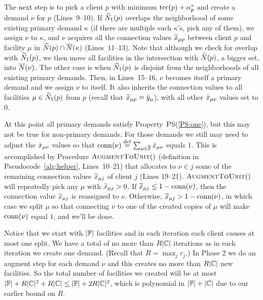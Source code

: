 \documentclass[11pt]{article}
\begin{document}


The next step is to pick a client $p$ with minimum
$\textrm{tcc}(p)+\alpha_p^\ast$ and create a demand $\nu$ for $p$
(Lines~9--10). If ${\widetilde N}_1(p)$ overlaps the neighborhood
of some existing primary demand $\kappa$ (if there are
multiple such $\kappa$'s, pick any of them), we assign $\nu$
to $\kappa$, and $\nu$ acquires all the connection values
${\widetilde x}_{\mu p}$ between client $p$ and facility $\mu$ in
${\widetilde N}(p)\cap {\overline{N}}(\kappa)$ (Lines~11--13). Note that
although we check for overlap with ${\widetilde N}_1(p)$, we then
move all facilities in the intersection with ${\widetilde N}(p)$,
a bigger set, into ${\overline{N}}(\nu)$.  The other case is when
${\widetilde N}_1(p)$ is disjoint from the neighborhoods of all
existing primary demands. Then, in Lines~15--16, $\nu$
becomes itself a primary demand and we assign $\nu$ to
itself. It also inherits the connection values to all
facilities $\mu\in{\widetilde N}_1(p)$ from $p$ (recall that
${\widetilde x}_{\mu p} = {\bar y}_{\mu}$), with all other
${\bar x}_{\mu\nu}$ values set to $0$.

At this point all primary demands satisfy
Property~PS(\ref{PS:one}), but this may not be true for
non-primary demands. For those demands we still may need to
adjust the ${\bar x}_{\mu\nu}$ values so that ${\textrm{conn}}(\nu)
\stackrel{\mathrm{def}}{=}
\sum_{\mu\in\overline{\mathbb{F}}}{\bar x}_{\mu \nu}$ equals $1$. This
is accomplished by Procedure ${\textsc{AugmentToUnit}}()$ (definition
in Pseudocode~\ref{alg:helper}, Lines~10--21) that allocates
to $\nu\in j$ some of the remaining connection values
${\widetilde x}_{\mu j}$ of client $j$ (Lines 19--21).
${\textsc{AugmentToUnit}}()$ will repeatedly pick any $\mu$ with
${\widetilde x}_{\mu j} >0$.  If ${\widetilde x}_{\mu j} \leq
1-{\textrm{conn}}(\nu)$, then the connection value ${\widetilde x}_{\mu
  j}$ is reassigned to $\nu$. Otherwise, ${\widetilde x}_{\mu j} >
1-{\textrm{conn}}(\nu)$, in which case we split $\mu$ so that
connecting $\nu$ to one of the created copies of $\mu$ will
make ${\textrm{conn}}(\nu)$ equal $1$, and we'll be done.

\smallskip

Notice that we start with $|\mathbb{F}|$ facilities and in
each iteration each client causes at most one split. We have
a total of no more than $R|\mathbb{C}|$ iterations as in
each iteration we create one demand. (Recall that $R =
\max_jr_j$.) In Phase 2 we do an augment step for each
demand $\nu$ and this creates no more than $R|\mathbb{C}|$
new facilities.  So the total number of facilities we
created will be at most $|\mathbb{F}|+ R|\mathbb{C}|^2 +
R|\mathbb{C}| \leq |\mathbb{F}| + 2R|\mathbb{C}|^2$, which is
polynomial in $|\mathbb{F}|+|\mathbb{C}|$ due to our earlier
bound on $R$.
\end{document}
